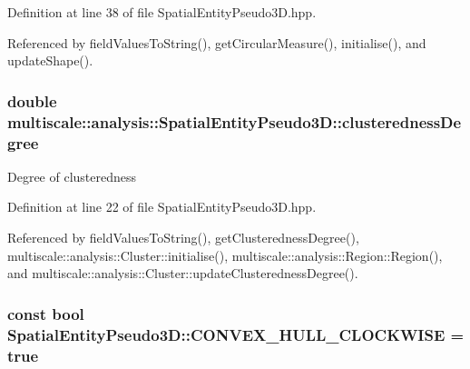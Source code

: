 \-Definition at line 38 of file \-Spatial\-Entity\-Pseudo3\-D.\-hpp.



\-Referenced by field\-Values\-To\-String(), get\-Circular\-Measure(), initialise(), and update\-Shape().

\hypertarget{classmultiscale_1_1analysis_1_1SpatialEntityPseudo3D_a22a84312e7c497cc5fbc4d8b41d8fd45}{
\subsubsection[{clusteredness\-Degree}]{\setlength{\rightskip}{0pt plus 5cm}double {\bf multiscale\-::analysis\-::\-Spatial\-Entity\-Pseudo3\-D\-::clusteredness\-Degree}}}\label{classmultiscale_1_1analysis_1_1SpatialEntityPseudo3D_a22a84312e7c497cc5fbc4d8b41d8fd45}
\-Degree of clusteredness 

\-Definition at line 22 of file \-Spatial\-Entity\-Pseudo3\-D.\-hpp.



\-Referenced by field\-Values\-To\-String(), get\-Clusteredness\-Degree(), multiscale\-::analysis\-::\-Cluster\-::initialise(), multiscale\-::analysis\-::\-Region\-::\-Region(), and multiscale\-::analysis\-::\-Cluster\-::update\-Clusteredness\-Degree().

\hypertarget{classmultiscale_1_1analysis_1_1SpatialEntityPseudo3D_ad92f43d2b14c77def3f7a70b54810dd2}{
\subsubsection[{\-C\-O\-N\-V\-E\-X\-\_\-\-H\-U\-L\-L\-\_\-\-C\-L\-O\-C\-K\-W\-I\-S\-E}]{\setlength{\rightskip}{0pt plus 5cm}const bool {\bf \-Spatial\-Entity\-Pseudo3\-D\-::\-C\-O\-N\-V\-E\-X\-\_\-\-H\-U\-L\-L\-\_\-\-C\-L\-O\-C\-K\-W\-I\-S\-E} = true}}\label{classmultiscale_1_1analysis_1_1SpatialEntityPseudo3D_ad92f43d2b14c77def3f7a70b54810dd2}


